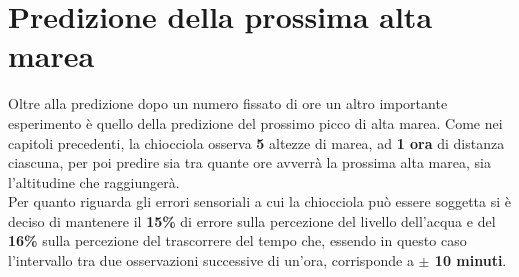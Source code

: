 \chapter{Predizione della prossima alta marea}
	Oltre alla predizione dopo un numero fissato di ore un altro importante esperimento è quello della predizione del prossimo picco di alta marea. Come nei capitoli precedenti, la chiocciola osserva \textbf{5} altezze di marea, ad \textbf{1 ora} di distanza ciascuna, per poi predire sia tra quante ore avverrà la prossima alta marea, sia l'altitudine che raggiungerà.\\
	Per quanto riguarda gli errori sensoriali a cui la chiocciola può essere soggetta si è deciso di mantenere il \textbf{15\%} di errore sulla percezione del livello dell'acqua e del \textbf{16\%} sulla percezione del trascorrere del tempo che, essendo in questo caso l'intervallo tra due osservazioni successive di un'ora, corrisponde a \textbf{\(\pm\) 10 minuti}.
